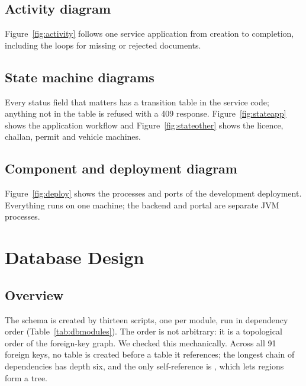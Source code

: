
\subsection{Activity diagram}
Figure~\ref{fig:activity} follows one service application from creation to completion,
including the loops for missing or rejected documents.


\subsection{State machine diagrams}
Every status field that matters has a transition table in the service code; anything not
in the table is refused with a 409 response. Figure~\ref{fig:stateapp} shows the
application workflow and Figure~\ref{fig:stateother} shows the licence, challan, permit
and vehicle machines.


\subsection{Component and deployment diagram}
Figure~\ref{fig:deploy} shows the processes and ports of the development deployment.
Everything runs on one machine; the backend and portal are separate JVM processes.


\section{Database Design}
\subsection{Overview}
The schema is created by thirteen scripts, one per module, run in dependency order
(Table~\ref{tab:dbmodules}). The order is not arbitrary: it is a topological order of the
foreign-key graph. We checked this mechanically. Across all 91 foreign keys, no table is
created before a table it references; the longest chain of dependencies has depth six,
and the only self-reference is , which lets regions form a
tree.

